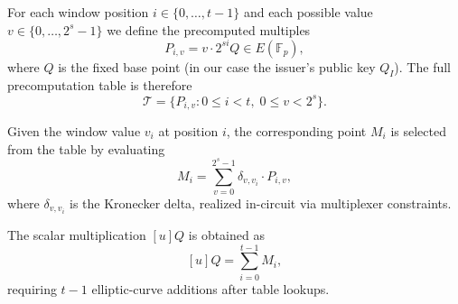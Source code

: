 \begin{definition}
	For each window position $i \in \{0,\dots,t-1\}$ and each possible value $v \in \{0,\dots,2^s-1\}$ we define the precomputed multiples
	\[
	P_{i,v} = v \cdot 2^{si} Q \in E(\mathbb{F}_p),
	\]
	where $Q$ is the fixed base point (in our case the issuer’s public key $Q_I$).
	The full precomputation table is therefore
	\[
	\mathcal{T} = \{ P_{i,v} : 0 \leq i < t,\; 0 \leq v < 2^s \}.
	\]
\end{definition}

\begin{definition}
	Given the window value $v_i$ at position $i$, the corresponding point $M_i$ is selected from the table by evaluating
	\[
	M_i = \sum_{v=0}^{2^s-1} \delta_{v,v_i} \cdot P_{i,v},
	\]
	where $\delta_{v,v_i}$ is the Kronecker delta, realized in-circuit via multiplexer constraints.
\end{definition}

\begin{definition}
	The scalar multiplication $[u]Q$ is obtained as
	\[
	[u]Q = \sum_{i=0}^{t-1} M_i,
	\]
	requiring $t-1$ elliptic-curve additions after table lookups.
\end{definition}
